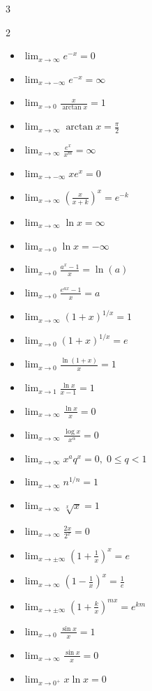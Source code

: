 \begin{multicols}{3}
\begin{multicols}{2}
\begin{itemize}[noitemsep, topsep=0pt, leftmargin=*]
\item $\lim_{x\to\infty}e^{-x}=0$
\item $\lim_{x\to-\infty}e^{-x}=\infty$
\item $\lim_{x\to0}\frac{x}{\arctan x}=1$
\item $\lim_{x\to\infty}\arctan x=\frac\pi2$

\item $\lim_{x\to\infty}\frac{e^x}{x^m}=\infty$
\item $\lim_{x\to-\infty}xe^x=0$
\item $\lim_{x\to\infty}\left(\frac{x}{x+k}\right)^x=e^{-k}$

\item $\lim_{x\to\infty}\ln x=\infty$
\item $\lim_{x\to0}\ln x=-\infty$
\item $\lim_{x\to0}\frac{a^x-1}{x}=\ln(a)$
\item $\lim_{x\to0}\frac{e^{ax}-1}{x}=a$

\item $\lim_{x\to\infty}(1+x)^{1/x}=1$
\item $\lim_{x\to0}(1+x)^{1/x}=e$
\item $\lim_{x\to0}\frac{\ln(1+x)}x=1$
\item $\lim_{x\to1}\frac{\ln x}{x-1}=1$

\item $\lim_{x\to\infty}\frac{\ln x}{x}=0$
\item $\lim_{x\to\infty}\frac{\log x}{x^\alpha}=0$

\item $\lim_{x\to\infty}x^aq^x=0,\;0\le q<1$
\item $\lim_{x\to\infty}n^{1/n}=1$
\item $\lim_{x\to\infty}\sqrt[x]{x}=1$
\item $\lim_{x\to\infty}\frac{2x}{2^x}=0$

\item $\lim_{x\to\pm\infty}\left(1+\frac1x\right)^x=e$
\item $\lim_{x\to\infty}\left(1-\frac1x\right)^x=\frac1e$

\item $\lim_{x\to\pm\infty}\left(1+\frac{k}{x}\right)^{mx}=e^{km}$

\item $\lim_{x\to0}\frac{\sin x}{x}=1$
\item $\lim_{x\to\infty}\frac{\sin x}{x}=0$
\item $\lim_{x\to0^+}x\ln x=0$


\end{itemize}
\end{multicols}
\end{multicols}
